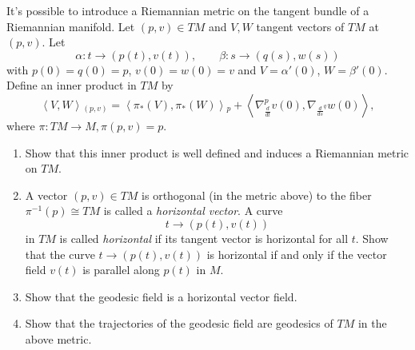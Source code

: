 \begin{exercise}
\label{exercise-geodesics-tangent-bundle}
It's possible to introduce a Riemannian
metric on the tangent bundle
of a Riemannian manifold. Let $(p,v) \in TM$
and $V,W$ tangent vectors
of $TM$ at $(p,v)$. Let
$$
\alpha:t \to (p(t),v(t)),\qquad  \beta:s \to
(q(s),w(s))
$$
with $p(0)=q(0)=p$, $v(0)=w(0)=v$
and $V=\alpha'(0)$, $W=\beta'(0)$.
Define an inner product in $TM$ by
\begin{equation}
\label{equation-tangent-bundle-metric}
\left\langle{}V,W\right\rangle{}_{(p,v)}
=\left\langle{}\pi_*(V),\pi_*(W)\right\rangle{}_p
+\left\langle{}\nabla^p_{\frac{d}{dt}}v(0),
\nabla_{\frac{d}{ds}^q}w(0)\right\rangle{},
\end{equation}
where $\pi:TM \to M, \pi(p,v)=p$.

\begin{enumerate}
\item Show that this inner product is well
defined
and induces a Riemannian metric on $TM$.

\item A vector $(p,v) \in TM$ is orthogonal
(in the metric above) to the fiber
$\pi^{-1}(p) \cong TM$
is called a {\it horizontal vector}. A curve
$$
t \to (p(t),v(t))
$$
in $TM$ is called {\it horizontal} if its
tangent vector is
horizontal for all $t$.
Show that the curve $t \to (p(t),v(t))$
is horizontal if and only if the vector field
$v(t)$
is parallel along $p(t)$ in $M$.

\item Show that the geodesic field is a
horizontal vector field.

\item Show that the trajectories of the
geodesic field
are geodesics of $TM$ in the above metric.
\end{enumerate}
\end{exercise}


